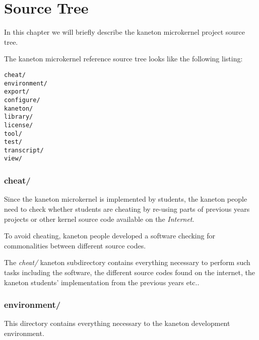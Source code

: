 %
%
%
%
%
%

%
%

\chapter{Source Tree}

In this chapter we will briefly describe the kaneton microkernel project
source tree.

\newpage

%
%

The kaneton microkernel reference source tree looks like the following
listing:

\begin{verbatim}
cheat/
environment/
export/
configure/
kaneton/
library/
license/
tool/
test/
transcript/
view/
\end{verbatim}

%
%

\subsection*{cheat/}

Since the kaneton microkernel is implemented by students, the kaneton
people need to check whether students are cheating by re-using parts of
previous years projects or other kernel source code available on the
\textit{Internet}.

To avoid cheating, kaneton people developed a software checking for
commonalities between different source codes.

The \textit{cheat/} kaneton subdirectory contains everything necessary
to perform such tasks including the software, the different source codes
found on the internet, the kaneton students' implementation from the
previous years etc..

%
%

\subsection*{environment/}

This directory contains everything necessary to the kaneton development
environment.

